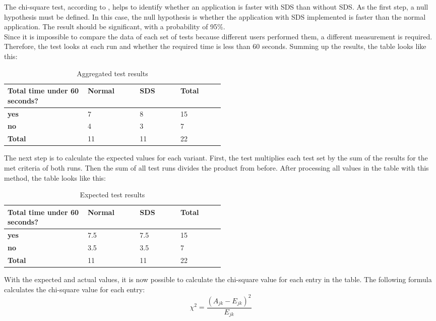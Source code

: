 The chi-square test, according to \citeauthor{pearson_x_1900}, helps to identify whether an application is faster with \ac{SDS} than without \ac{SDS}. As the first step, a null hypothesis must be defined. In this case, the null hypothesis is whether the application with SDS implemented is faster than the normal application. The result should be significant, with a probability of 95\%. \cite{pearson_x_1900} \\ 
Since it is impossible to compare the data of each set of tests because different users performed them, a different measurement is required. Therefore, the test looks at each run and whether the required time is less than 60 seconds. Summing up the results, the table looks like this:
\begin{table}[ht]
    \centering
    \begin{tabular}{|p{0.2\linewidth} || p{0.1\linewidth}|p{0.1\linewidth}|p{0.1\linewidth}|}
        \hline
        \textbf{Total time under 60 seconds?} &\textbf{Normal}&\textbf{\ac{SDS}}&\textbf{Total} \\ \hline\hline
        \textbf{yes} & 7 & 8 & 15 \\ \hline
        \textbf{no} & 4 & 3 & 7 \\ \hline
        \textbf{Total} & 11 & 11 & 22 \\ \hline
    \end{tabular}
    \caption{\label{tab:chi-square} Aggregated test results}
\end{table}
The next step is to calculate the expected values for each variant. First, the test multiplies each test set by the sum of the results for the met criteria of both runs. Then the sum of all test runs divides the product from before. After processing all values in the table with this method, the table looks like this: 
\begin{table}[ht]
    \centering
    \begin{tabular}{|p{0.2\linewidth} || p{0.1\linewidth}|p{0.1\linewidth}|p{0.1\linewidth}|}
        \hline
        \textbf{Total time under 60 seconds?} &\textbf{Normal}&\textbf{\ac{SDS}}&\textbf{Total} \\ \hline\hline
        \textbf{yes} & 7.5 & 7.5 & 15 \\ \hline
        \textbf{no} & 3.5 & 3.5 & 7 \\ \hline
        \textbf{Total} & 11 & 11 & 22 \\ \hline
    \end{tabular}
    \caption{\label{tab:chi-square-expected} Expected test results}
\end{table}
With the expected and actual values, it is now possible to calculate the chi-square value for each entry in the table. The following formula calculates the chi-square value for each entry:
\[\chi^2=\frac{(A_{jk} - E_{jk})^2}{E_{jk}}\]

